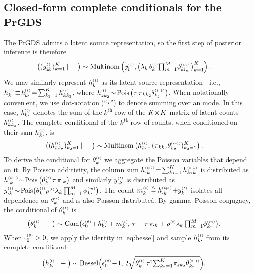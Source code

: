 \documentclass{article}
\begin{document}
\subsection{Closed-form complete conditionals for the PrGDS}
The PrGDS admits a latent source representation, so the first step of posterior inference is therefore
\begin{align}
  \compcond{(y^{\mathsmaller{(t)}}_{\osubs k})_{k=1}^K} &\sim \Multi{\ydt,\big(\lambda_k \, \thetakt \mathsmaller{\prod}_{m=1}^M \phimki\big)_{k=1}^K}.
  \end{align}
We may similarly represent $\hkt$ as its latent source representation---i.e., $\hkt \tequiv \hkdt \teq \sum_{k_2=1}^K \hkkt$, where $\hkkt \tsim \Pois{\tau \, \pi_{kk_2} \thetakttm}$. When notationally convenient, we use dot-notation (``$\boldsymbol{\cdot}$'') to denote summing over an mode. In this case, $\hkdt$ denotes the sum of the $k^{\textrm{th}}$ row of the $K \!\times\! K$ matrix of latent counts $\hkkt$. The complete conditional of the $k^{\textrm{th}}$ row of counts, when conditioned on their sum $\hkdt$, is~
\begin{align}
\compcond{(\hkkt)_{k_2=1}^K} &\sim \Multi{\hkdt,\,(\pi_{kk_2} \thetakttm)_{k_2=1}^K}.
\end{align}
To derive the conditional for $\thetakt$ we aggregate the Poisson variables that depend on it. By Poisson additivity, the column sum $\hdktp \teq \sum_{k_1=1}^K h_{k_1k}^{\mathsmaller{(t \tp 1)}}$ is distributed as $\hdktp \tsim \Pois{\thetakt \, \tau\,\pi_{\bcdot k}}$ and similarly $y_{\bcdot k}^{\mathsmaller{(t)}}$ is distributed as $y_{\bcdot k}^{\mathsmaller{(t)}} \tsim \textrm{Pois}\big(\thetakt \rhot \lambda_k \prod_{m=1}^M\phi^{\mathsmaller{(m)}}_{k\bcdot}\big)$. The count $\mkt \triangleq \hdktp \tp \ykt$ isolates all dependence on $\thetakt$ and is also Poisson distributed. By gamma--Poisson conjugacy, the conditional of $\thetakt$ is~
\begin{align}
  \compcond{\thetakt} &\sim \textrm{Gam}\big(\epstheta \tp \hkdt + \mkt,\, \tau + \tau\,\pi_{\bcdot k}+ \rhot \lambda_k \, \mathsmaller{\prod}_{m=1}^M \phi^{\mathsmaller{(m)}}_{k\bcdot }\big).
\end{align}
When $\epstheta > 0$, we apply the identity in \cref{eq:bessel} and sample $\hkdt$ from its complete conditional:
\begin{align}
\compcond{\hkdt} &\sim \textrm{Bessel}\Big(\epstheta \tm 1,\, 2 \sqrt{\thetakt \, \tau^2 \mathsmaller{\sum}_{k_2=1}^K \pi_{kk_2} \thetakttm}\Big).
\end{align}
\end{document}
